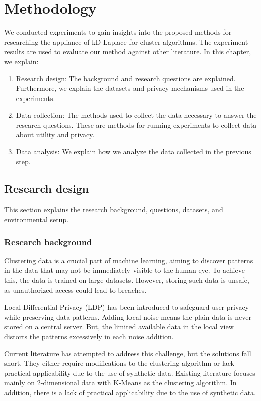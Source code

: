\chapter{Methodology}

We conducted experiments to gain insights into the proposed methods for researching the appliance of kD-Laplace for cluster algorithms.
The experiment results are used to evaluate our method against other literature.
In this chapter, we explain:
\begin{enumerate}

  \item Research design: The background and research questions are explained.
        Furthermore, we explain the datasets and privacy mechanisms used in the experiments.
  \item Data collection: The methods used to collect the data necessary to answer the research questions.
        These are methods for running experiments to collect data about utility and privacy.
  \item Data analysis: We explain how we analyze the data collected in the previous step.
\end{enumerate}

\section{Research design}
This section explains the research background, questions, datasets, and environmental setup.
\subsection{Research background}
Clustering data is a crucial part of machine learning, aiming to discover patterns in the data that may not be immediately visible to the human eye.
To achieve this, the data is trained on large datasets.
However, storing such data is unsafe, as unauthorized access could lead to breaches.

Local Differential Privacy (LDP) has been introduced to safeguard user privacy while preserving data patterns.
Adding local noise means the plain data is never stored on a central server.
But, the limited available data in the local view distorts the patterns excessively in each noise addition.

Current literature has attempted to address this challenge, but the solutions fall short.
They either require modifications to the clustering algorithm or lack practical applicability due to the use of synthetic data.
Existing literature focuses mainly on 2-dimensional data with K-Means as the clustering algorithm.
In addition, there is a lack of practical applicability due to the use of synthetic data.

